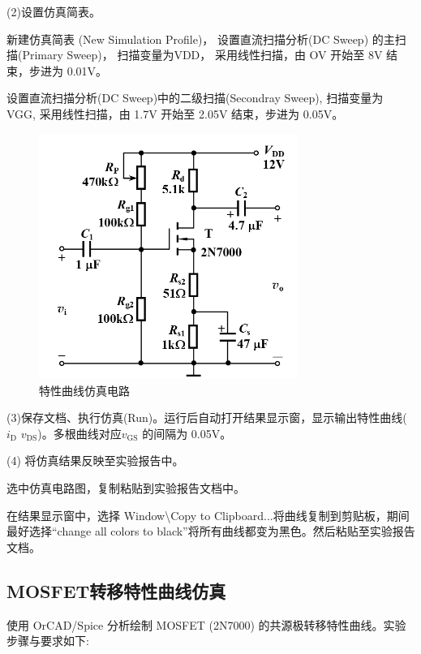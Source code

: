 \documentclass[a4paper,11pt,UTF8]{article}
\numberwithin{equation}{subsection}
\begin{document}
\begin{minipage}[t]{0.6\textwidth}
	(2)设置仿真简表。
	
	 新建仿真简表 (New Simulation Profile)， 设置直流扫描分析(DC Sweep) 的主扫描(Primary Sweep)， 扫描变量为VDD， 采用线性扫描，由 OV 开始至 8V 结束，步进为  0.01V。
	
	 设置直流扫描分析(DC Sweep)中的二级扫描(Secondray Sweep), 扫描变量为 VGG, 采用线性扫描，由 1.7V 开始至 2.05V 结束，步进为 0.05V。
\end{minipage}
\begin{minipage}[t]{0.4\textwidth}
	\begin{figure}[H]
		\centering
		\includegraphics[width=0.75\textwidth]{2.1}
		\caption{特性曲线仿真电路}
	\end{figure}
\end{minipage}


(3)保存文档、执行仿真(Run)。运行后自动打开结果显示窗，显示输出特性曲线($i_\mathrm{D}$ $v_\mathrm{DS}$)。多根曲线对应$v_\mathrm{GS}$ 的间隔为 0.05V。

(4) 将仿真结果反映至实验报告中。

 选中仿真电路图，复制粘贴到实验报告文档中。

 在结果显示窗中，选择 Window\textbackslash Copy to Clipboard...将曲线复制到剪贴板，期间最好选择“change all colors to black”将所有曲线都变为黑色。然后粘贴至实验报告文档。
\subsection{MOSFET转移特性曲线仿真}
使用 OrCAD/Spice 分析绘制 MOSFET (2N7000) 的共源极转移特性曲线。实验步骤与要求如下:
\end{document}
